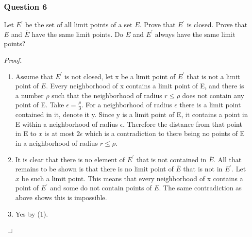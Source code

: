 \documentclass[12pt, letterpaper]{paper}
\begin{document}
\subsubsection{Question 6}
\label{sec:org2dbd158}
\begin{question}
  Let $E^{\prime}$ be the set of all limit points of a set $E$. Prove
  that $E^{\prime}$ is closed.  Prove that $E$ and $\bar{E}$ have the
  same limit points. Do $E$ and $E^{\prime}$ always have the same
  limit points?
\end{question}
\begin{proof}
  \begin{enumerate}
  \item Assume that $E^{\prime}$ is not closed, let x be a limit point
    of $E^{\prime}$ that is not a limit point of $E$. Every
    neighborhood of x contains a limit point of E, and there is a
    number $\rho$ such that the neighborhood of radius $r \leq \rho$
    does not contain any point of E. Take $\epsilon =
    \frac{\rho}{3}$. For a neighborhood of radius $\epsilon$ there is
    a limit point contained in it, denote it y. Since y is a limit
    point of E, it contains a point in E within a neighborhood of
    radius $\epsilon$. Therefore the distance from that point in E to
    $x$ is at most $2\epsilon$ which is a contradiction to there being
    no points of E in a neighborhood of radius $r \leq \rho$.
  
  \item It is clear that there is no element of $E^{\prime}$ that is
    not contained in $\bar{E}$. All that remains to be shown is that
    there is no limit point of $\bar{E}$ that is not in
    $E^{\prime}$. Let $x$ be such a limit point. This means that every
    neighborhood of x contains a point of $E^{\prime}$ and some do not
    contain points of $E$. The same contradiction as above shows this
    is impossible.
    
  \item Yes by (1).
  \end{enumerate}
\end{proof}
\end{document}
